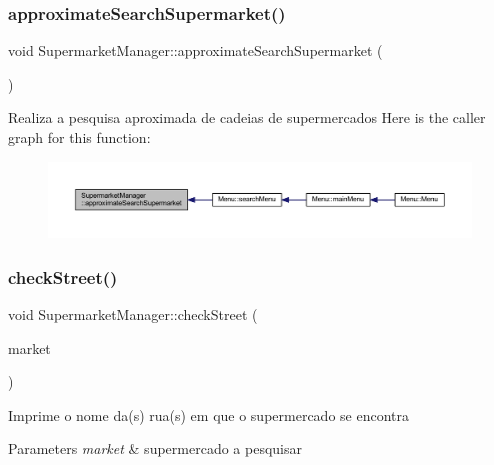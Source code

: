 \subsubsection{\texorpdfstring{approximate\+Search\+Supermarket()}{approximateSearchSupermarket()}}
{\footnotesize\ttfamily void Supermarket\+Manager\+::approximate\+Search\+Supermarket (\begin{DoxyParamCaption}{ }\end{DoxyParamCaption})}

Realiza a pesquisa aproximada de cadeias de supermercados Here is the caller graph for this function\+:
\nopagebreak
\begin{figure}[H]
\begin{center}
\leavevmode
\includegraphics[width=350pt]{class_supermarket_manager_af797d69ada273a0582a619a0fc8f0638_icgraph}
\end{center}
\end{figure}
\mbox{\label{class_supermarket_manager_a7eca833133baf500e2a63b2ec9746b1d}} 
\subsubsection{\texorpdfstring{check\+Street()}{checkStreet()}}
{\footnotesize\ttfamily void Supermarket\+Manager\+::check\+Street (\begin{DoxyParamCaption}\item[{\hyperlink{class_node_object}{Node\+Object} $\ast$}]{market }\end{DoxyParamCaption})}

Imprime o nome da(s) rua(s) em que o supermercado se encontra 
\begin{DoxyParams}{Parameters}
{\em market} & supermercado a pesquisar \\
\hline
\end{DoxyParams}
\mbox{\label{class_supermarket_manager_a23d192df8b8a56e317632845f9bb81d6}} 
